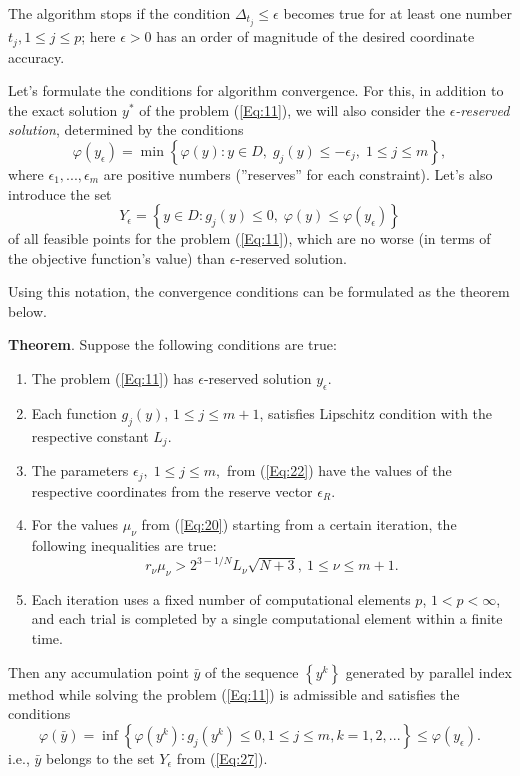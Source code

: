 \documentclass{llncs}
\begin{document}
\begin{enumerate}
\end{enumerate}

The algorithm stops if the condition $\Delta_{t_j}\leq \epsilon$ becomes true for at least one number $t_j, 1\leq j \leq p$; here  $\epsilon>0$ has an order of magnitude of the desired coordinate accuracy.

Let's formulate the conditions for algorithm convergence. For this, in addition to the exact solution $y^\ast$ of the problem (\ref{Eq:11}), we will also consider the \textit{$\epsilon$-reserved solution}, determined by the conditions
\[
\varphi(y_\epsilon)=\min{\left\{\varphi(y): y\in D, \; g_j(y)\leq -\epsilon _j, \; 1\leq j\leq m\right\}},
\]
where $\epsilon_1,...,\epsilon_m$ are positive numbers  (''reserves'' for each constraint). Let's also introduce the set
\begin{equation}\label{Eq:27}
Y_\epsilon=\left\{y\in D: g_j(y)\leq 0, \; \varphi(y)\leq\varphi(y_\epsilon)\right\}
\end{equation}
of all feasible points for the problem (\ref{Eq:11}), which are no worse (in terms of the objective function's value) than  $\epsilon$-reserved solution.

Using this notation, the convergence conditions can be formulated as the theorem below.

\textbf{Theorem}. Suppose the following conditions are true:
\begin{enumerate}
\item
The problem  (\ref{Eq:11}) has $\epsilon$-reserved solution $y_\epsilon$.
\item
Each function  $g_j(y)$, $1\leq j \leq m+1$, satisfies Lipschitz condition with the respective constant $L_j$.
\item
The parameters  $\epsilon_j, \; 1 \leq j \leq m,$ from  (\ref{Eq:22}) have the values of the respective coordinates from the reserve vector $\epsilon_R$.
\item
For the values  $\mu_\nu$ from (\ref{Eq:20}) starting from a certain iteration, the following inequalities are true:
\[
r_\nu\mu_\nu>2^{3-1/N}L_\nu\sqrt{N+3}, \ 1 \leq \nu \leq m+1.
\]
\item
Each iteration uses a fixed number of computational elements  $p$, $1<p<\infty$, and each trial is completed by a single computational element within a finite time.
\end{enumerate}

Then any accumulation point $\bar{y}$ of the sequence $\left\{y^k\right\}$ generated by parallel index method while solving the problem (\ref{Eq:11}) is admissible and satisfies the conditions 
\[
\varphi(\bar{y})=\inf \left\{\varphi(y^k):g_j(y^k) \leq 0, 1 \leq j \leq m, k=1,2,...\right\}\leq \varphi (y_\epsilon).
\]
i.e., $\bar{y}$ belongs to the set $Y_\epsilon$ from (\ref{Eq:27}).
\end{document}
